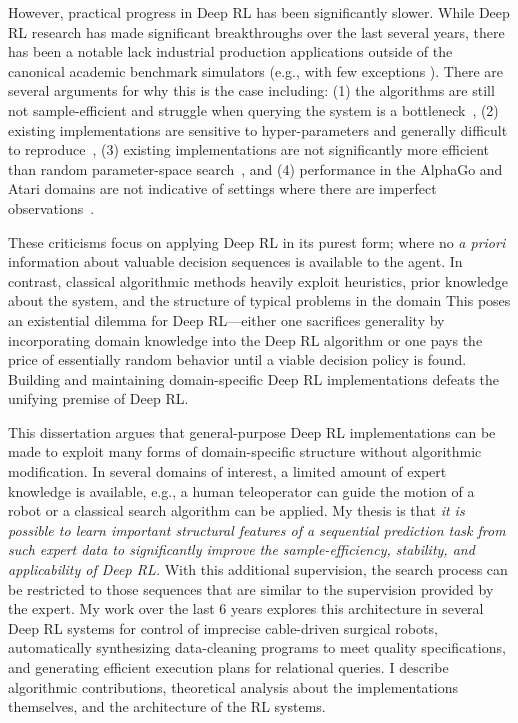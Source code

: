 However, practical progress in Deep RL has been significantly slower. 
While Deep RL research has made significant breakthroughs over the last several years, there has been a notable lack industrial production applications outside of the canonical academic benchmark simulators (e.g., with few exceptions \cite{mirhoseini2017device}). 
There are several arguments for why this is the case including: (1) the algorithms are still not sample-efficient and struggle when querying the system is a bottleneck~\cite{sunderhauf2018limits, stoica2017berkeley}, (2) existing implementations are sensitive to hyper-parameters and generally difficult to reproduce~\cite{islam2017reproducibility, henderson2017deep}, (3) existing implementations are not significantly more efficient than random parameter-space search~\cite{mania2018simple, salimans2017evolution}, and (4) performance in the AlphaGo and Atari domains are not indicative of settings where there are imperfect observations~\cite{stoica2017berkeley, sunderhauf2018limits}.

These criticisms focus on applying Deep RL in its purest form; where no \emph{a priori} information about valuable decision sequences is available to the agent.
In contrast, classical algorithmic methods heavily exploit heuristics, prior knowledge about the system, and the structure of typical problems in the domain 
This poses an existential dilemma for Deep RL---either one sacrifices generality by incorporating domain knowledge into the Deep RL algorithm or one pays the price of essentially random behavior until a viable decision policy is found. Building and maintaining domain-specific Deep RL implementations defeats the unifying premise of Deep RL.

This dissertation argues that general-purpose Deep RL implementations can be made to exploit many forms of domain-specific structure without algorithmic modification. In several domains of interest, a limited amount of expert knowledge is available, e.g., a human teleoperator can guide the motion of a robot or a classical search algorithm can be applied. 
My thesis is that \emph{it is possible to learn important structural features of a sequential prediction task from such expert data to significantly improve the sample-efficiency, stability, and applicability of Deep RL.} 
With this additional supervision, the search process can be restricted to those sequences that are similar to the supervision provided by the expert.
My work over the last 6 years explores this architecture in several Deep RL systems for control of imprecise cable-driven surgical robots, automatically synthesizing data-cleaning programs to meet quality specifications, and generating efficient execution plans for relational queries. I describe algorithmic contributions, theoretical analysis about the implementations themselves, and the architecture of the RL systems.


